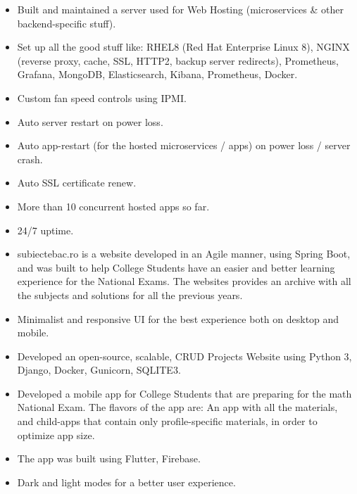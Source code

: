\documentclass[10pt,a4paper,ragged2e]{resume}
\begin{document}
\begin{fullwidth}
        \begin{itemize}
            \item Built and maintained a server used for Web Hosting (microservices \& other backend-specific stuff).
            \item Set up all the good stuff like: RHEL8 (Red Hat Enterprise Linux 8), NGINX (reverse proxy, cache, SSL, HTTP2, backup server redirects), Prometheus, Grafana, MongoDB, Elasticsearch, Kibana, Prometheus, Docker.
            \item Custom fan speed controls using IPMI.
            \item Auto server restart on power loss.
            \item Auto app-restart (for the hosted microservices / apps) on power loss / server crash.
            \item Auto SSL certificate renew.
            \item More than 10 concurrent hosted apps so far.
            \item 24/7 uptime.
        \end{itemize}
        \divider

        \begin{itemize}
            \item subiectebac.ro is a website developed in an Agile manner, using Spring Boot, and was built to help College Students have an easier and better learning experience for the National Exams.
            \itme The websites provides an archive with all the subjects and solutions for all the previous years.
            \item Minimalist and responsive UI for the best experience both on desktop and mobile.
        \end{itemize}
        \divider

        \begin{itemize}
            \item Developed an open-source, scalable, CRUD Projects Website using Python 3, Django, Docker, Gunicorn, SQLITE3.
        \end{itemize}

        \begin{itemize}
            \item Developed a mobile app for College Students that are preparing for the math National Exam. The flavors of the app are: An app with all the materials, and child-apps that contain only profile-specific materials, in order to optimize app size.
            \item The app was built using Flutter, Firebase.
            \item Dark and light modes for a better user experience.
        \end{itemize}
        \divider


\end{fullwidth}
\end{document}
